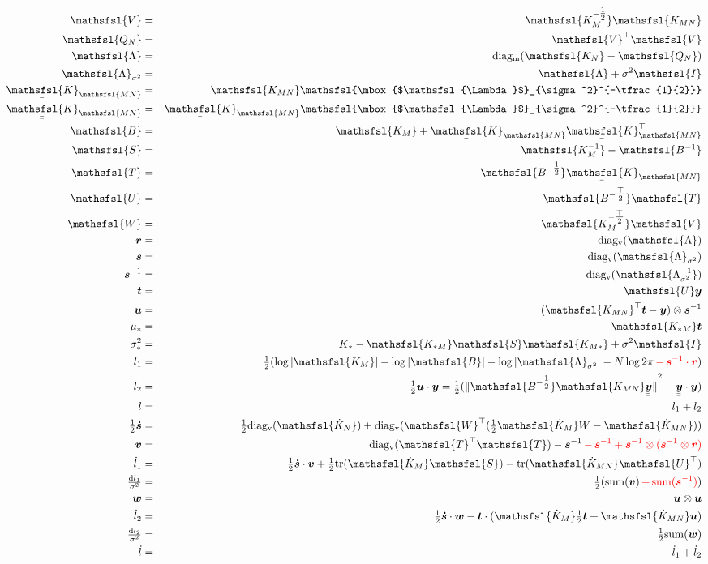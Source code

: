 \documentclass[12pt]{article}
\newcommand{\red}{\textcolor{red}}
\newcommand{\dif}{\mathrm{d}}
\newcommand{\myu}[1]{\underaccent{\bar}{#1}}
\newcommand{\onehalf}{\tfrac{1}{2}}
\newcommand{\mat}[1]{\mbox{$\mathsfsl{#1}$}}
\newcommand{\myvec}[1]{\mbox{\boldmath$#1$}}
\newcommand{\diagv}[1]{\mathrm{diag_v}(#1)}
\newcommand{\diagm}[1]{\mathrm{diag_m}(#1)}
\newcommand{\trace}[1]{\mathrm{tr}(#1)}
\newcommand{\transm}[1]{\mat{#1}^\top}
\newcommand{\imat}[1]{\mat{#1^{-1}}}
\newcommand{\ichol}[1]{\mat{#1^{-\onehalf}}}
\newcommand{\icholt}[1]{\mat{#1^{-\tfrac{\top}{2}}}}
\newcommand{\Km}{\mat{K_M}}
\newcommand{\dKm}{\mat{\dot{K}_M}}
\newcommand{\dkn}{\mat{\dot{K}_N}}
\newcommand{\Kmn}{\mat{K_{MN}}}
\newcommand{\Knm}{\transm{K_{MN}}}
\newcommand{\uKnm}{\myu{\mat{K}}_{\mathsfsl{MN}}^\top}
\newcommand{\dKmn}{\mat{\dot{K}_{MN}}}
\newcommand{\uKmn}{\myu{\mat{K}}_{\mathsfsl{MN}}}
\newcommand{\uuKmn}{\myu{\myu{\mat{K}}}_{\mathsfsl{MN}}}
\newcommand{\dl}{\dot{l}}
\newcommand{\vecr}{\myvec{r}}
\newcommand{\vecs}{\myvec{s}}
\newcommand{\vect}{\myvec{t}}
\newcommand{\vecv}{\myvec{v}}
\newcommand{\vecu}{\myvec{u}}
\newcommand{\vecw}{\myvec{w}}
\newcommand{\vecy}{\myvec{y}}
\newcommand{\uuvecy}{\myu{\myu{\vecy}}}
\newcommand{\vecsdh}{\onehalf\myvec{\dot{s}}}
\newcommand{\vecis}{\myvec{s}^{-1}}
\newcommand{\matB}{\mat{B}}
\newcommand{\matI}{\mat{I}}
\newcommand{\matS}{\mat{S}}
\newcommand{\matT}{\mat{T}}
\newcommand{\matU}{\mat{U}}
\newcommand{\matV}{\mat{V}}
\newcommand{\matW}{\mat{W}}
\newcommand{\Lam}{\mat{\Lambda}}
\newcommand{\Lamss}{\mat{\Lambda}_{\sigma^2}}
\newcommand{\Lamssi}{\imat{\Lambda_{\sigma^2}}}
\begin{document}
\begin{eqnarray*}
\matV & = & \ichol{K_M}\Kmn \\
\mat{Q_N} & = & \transm{V} \matV \\
\Lam & = & \diagm{\mat{K_N} - \mat{Q_N}} \\
\Lamss & = & \Lam + \sigma^2 \matI \\
\uKmn & = & \Kmn \ichol{\Lamss} \\
\uuKmn & = & \uKmn\ichol{\Lamss} \\
\matB & = & \Km + \uKmn\uKnm \\
\matS & = & \imat{K_M} - \imat{B} \\
\matT & = & \ichol{B}\uuKmn \\
\matU & = & \icholt{B}\matT \\
\matW & = & \icholt{K_M}\mat{V} \\
\vecr & = & \diagv{\Lam} \\
\vecs & = & \diagv{\Lamss} \\
\vecis & = & \diagv{\Lamssi} \\
\vect & = & \matU \vecy \\
\vecu & = & (\Knm \vect - \vecy) \otimes \vecis \\
\mu_* & = & \mat{K_{*M}} \vect \\
\sigma^2_* & = & K_* - \mat{K_{*M}}\matS\mat{K_{M*}} + \sigma^2 \matI \\
l_1 & = & \onehalf (\log|\Km| - \log|\matB| - \log|\Lamss| - N \log 2\pi \red{\, - \, \vecis \cdot \vecr}) \\
l_2 & = & \onehalf \vecu\cdot\vecy = \onehalf({\|\ichol{B}\Kmn\uuvecy\|}^2 - \uuvecy\cdot\vecy) \\
l & = & l_1 + l_2 \\
\vecsdh & = & \onehalf\diagv{\dkn} + \diagv{\transm{W}(\onehalf\dKm W - \dKmn)} \\
\vecv & = & \diagv{\transm{T}\matT} - \vecis \red{\, - \, \vecis + \vecis\otimes(\vecis \otimes \vecr)} \\
\dl_1 & = & \vecsdh\cdot\vecv + \onehalf\trace{\dKm\matS} - \trace{\dKmn\transm{U}} \\
\tfrac{\dif l_1}{\sigma^2} & = & \onehalf (\mathrm{sum}(\vecv) \red {\, + \, \mathrm{sum}(\vecis)}) \\
\vecw & = & \vecu \otimes \vecu \\
\dl_2 & = & \vecsdh\cdot\vecw - \vect\cdot(\dKm \onehalf \vect + \dKmn \vecu) \\
\tfrac{\dif l_2}{\sigma^2} & = & \onehalf \mathrm{sum}(\vecw) \\
\dl & = & \dl_1 + \dl_2 \\
\end{eqnarray*}
\end{document}
